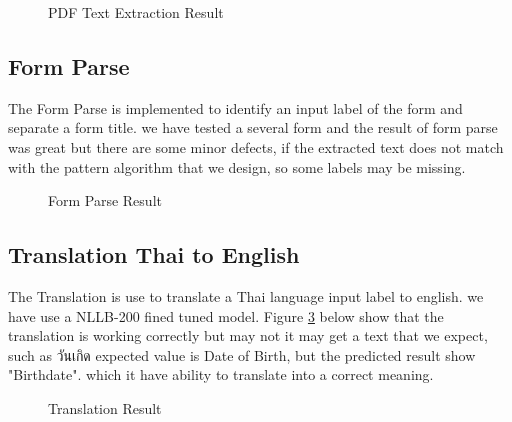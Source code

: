 \documentclass[12pt,oneside,openright,a4paper]{cpe-english-project}
\begin{document}
\begin{figure}[H]
\centering
{}
\caption{PDF Text Extraction Result}\label{fig:pdf-result}
\end{figure}

\subsection{Form Parse}
The Form Parse is implemented to identify an input label of the form and separate a form title. we have tested a several form and the result of form parse was 
great but there are some minor defects, if the extracted text does not match with the pattern algorithm that we design, so some labels may be missing.

\begin{figure}[H]
\centering
{}
\caption{Form Parse Result}\label{fig:Form-Parse}
\end{figure}

\subsection{Translation Thai to English}
The Translation is use to translate a Thai language input label to english. we have use a NLLB-200 fined tuned model. Figure \ref{fig:trans-result} below show that the translation is working correctly but may not it may get a text that we expect, such as วันเกิด expected value is Date of Birth, but the predicted result show "Birthdate". which it have ability to translate into a correct meaning.

\begin{figure}[H]
\centering
{}
\caption{Translation Result}\label{fig:trans-result}
\end{figure}
\end{document}
